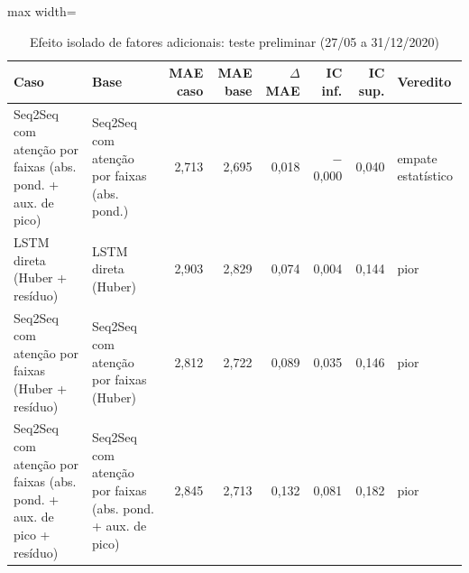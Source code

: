 \begin{table}[!htbp]
    \centering
    \caption{Efeito isolado de fatores adicionais: teste preliminar (27/05 a 31/12/2020)}
    \label{tab:extras_teste_historico}
    \small
    \begin{adjustbox}{max width=\textwidth}
    \begin{tabular}{>{\raggedright\arraybackslash}p{}>{\raggedright\arraybackslash}p{}rrrrrl}
        \toprule
        Caso & Base & MAE caso & MAE base & $\Delta$ MAE & IC inf. & IC sup. & Veredito \\
        \midrule
        Seq2Seq com atenção por faixas (abs. pond. + aux. de pico) & Seq2Seq com atenção por faixas (abs. pond.) & 2,713 & 2,695 & 0,018 & $-$0,000 & 0,040 & empate estatístico \\
        LSTM direta (Huber + resíduo) & LSTM direta (Huber) & 2,903 & 2,829 & 0,074 & 0,004 & 0,144 & pior \\
        Seq2Seq com atenção por faixas (Huber + resíduo) & Seq2Seq com atenção por faixas (Huber) & 2,812 & 2,722 & 0,089 & 0,035 & 0,146 & pior \\
        Seq2Seq com atenção por faixas (abs. pond. + aux. de pico + resíduo) & Seq2Seq com atenção por faixas (abs. pond. + aux. de pico) & 2,845 & 2,713 & 0,132 & 0,081 & 0,182 & pior \\
        \bottomrule
    \end{tabular}
    \end{adjustbox}
\end{table}
